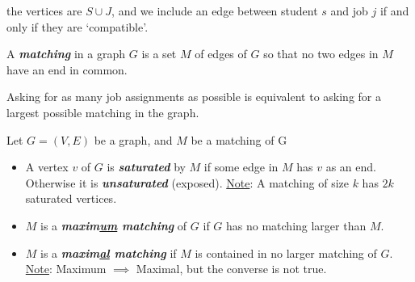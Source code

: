 \begin{figure}[H]

\end{figure}
the vertices are $ S\cup J $, and we include an edge between student $ s $ and job $ j $
if and only if they are `compatible'.


\begin{Definition}{}{}
    A \textbf{\emph{matching}} in a graph $ G $ is a set $ M $ of edges of $ G $
    so that no two edges in $ M $ have an end in common.
\end{Definition}

Asking for as many job assignments as possible is equivalent to asking for a largest
possible matching in the graph.


\begin{Definition}{}{}
    Let $ G=(V,E) $ be a graph, and $ M $ be a matching of G
    \begin{itemize}
        \item A vertex $ v $ of $ G $ is \textbf{\emph{saturated}} by $ M $
              if some edge in $ M $ has $ v $ as an end. Otherwise it is \textbf{\emph{unsaturated}}
              (exposed). \underline{Note}: A matching of size $ k $ has $ 2k $ saturated vertices.
        \item $ M $ is a \textbf{\emph{maxim\underline{um} matching}} of $ G $ if $ G $ has no matching
              larger than $ M $.
        \item $ M $ is a \textbf{\emph{maxim\underline{al} matching}} if $ M $ is contained in no larger
              matching of $ G $. \underline{Note}: Maximum $ \implies $ Maximal, but the converse is not true.
    \end{itemize}

\end{Definition}


